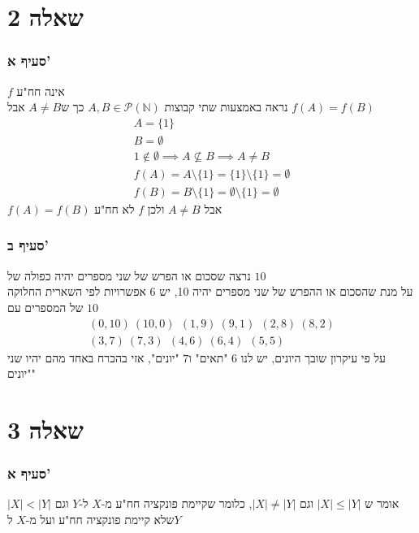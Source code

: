 \documentclass[12pt, titlepage]{article}
\begin{document}
\part*{שאלה 2}
\section*{סעיף א'}
$f$ אינה חח"ע\\
נראה באמצעות שתי קבוצות $A,B\in\mathcal{P}\left(\mathbb{N}\right)$ כך ש$A\neq B$ אבל $f(A)=f(B)$
\begin{gather*}
    A=\{1\}\\
    B=\emptyset\\
    1\notin \emptyset \implies A\not\subseteq B\implies A \neq B\\
    f(A)=A\setminus\{1\}=\{1\}\setminus\{1\}=\emptyset\\
    f(B)=B\setminus\{1\}=\emptyset\setminus\{1\}=\emptyset
\end{gather*}
$f(A)=f(B)$ אבל $A\neq B$ ולכן $f$ לא חח"ע
\section*{סעיף ב'}
נרצה שסכום או הפרש של שני מספרים יהיה כפולה של $10$\\
על מנת שהסכום או ההפרש של שני מספרים יהיה 10, יש 6 אפשרויות לפי השארית החלוקה של המספרים עם $10$
\begin{gather*}
    \boxed{\left(0,10\right)~\left(10,0\right)}~~\boxed{\left(1,9\right)~\left(9,1\right)}~~\boxed{\left(2,8\right)~\left(8,2\right)}\\
    \boxed{\left(3,7\right)~\left(7,3\right)}~~\boxed{\left(4,6\right)~\left(6,4\right)}~~\boxed{\left(5,5\right)}
\end{gather*}
על פי עיקרון שובך היונים, יש לנו $6$ "תאים" ו$7$ "יונים", אזי בהכרח באחד מהם יהיו שני "יונים"
\part*{שאלה 3}
\section*{סעיף א'}
$\left|X\right|<\left|Y\right|$ אומר ש $|X|\leq|Y|$ וגם $|X|\neq|Y|$, כלומר שקיימת פונקציה חח"ע מ-$X$ ל-$Y$ וגם שלא קיימת פונקציה חח"ע ועל מ-$X$ ל$Y$
\end{document}
